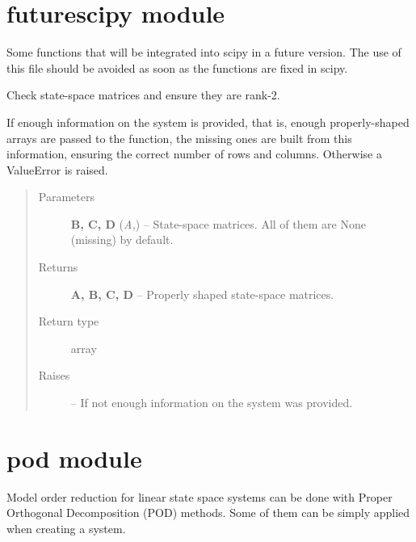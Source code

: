\documentclass[letterpaper,10pt,english]{sphinxmanual}
\begin{document}
\chapter{futurescipy module}
\label{futurescipy:module-futurescipy}\label{futurescipy::doc}\label{futurescipy:futurescipy-module}
Some functions that will be integrated into scipy in a future version. The use
of this file should be avoided as soon as the functions are fixed in scipy.

\begin{fulllineitems}
\label{futurescipy:futurescipy.abcd_normalize}
Check state-space matrices and ensure they are rank-2.

If enough information on the system is provided, that is, enough
properly-shaped arrays are passed to the function, the missing ones
are built from this information, ensuring the correct number of
rows and columns. Otherwise a ValueError is raised.
\begin{quote}\begin{description}
\item[{Parameters}] \leavevmode
\textbf{B, C, D} (\emph{A,}) -- State-space matrices. All of them are None (missing) by default.

\item[{Returns}] \leavevmode
\textbf{A, B, C, D} --
Properly shaped state-space matrices.

\item[{Return type}] \leavevmode
array

\item[{Raises}] \leavevmode
{} --
If not enough information on the system was provided.

\end{description}\end{quote}

\end{fulllineitems}



\chapter{pod module}
\label{pod:module-pod}\label{pod:pod-module}\label{pod::doc}
Model order reduction for linear state space systems can be done with
Proper Orthogonal Decomposition (POD) methods. Some of them can be simply
applied when creating a system.
\end{document}
